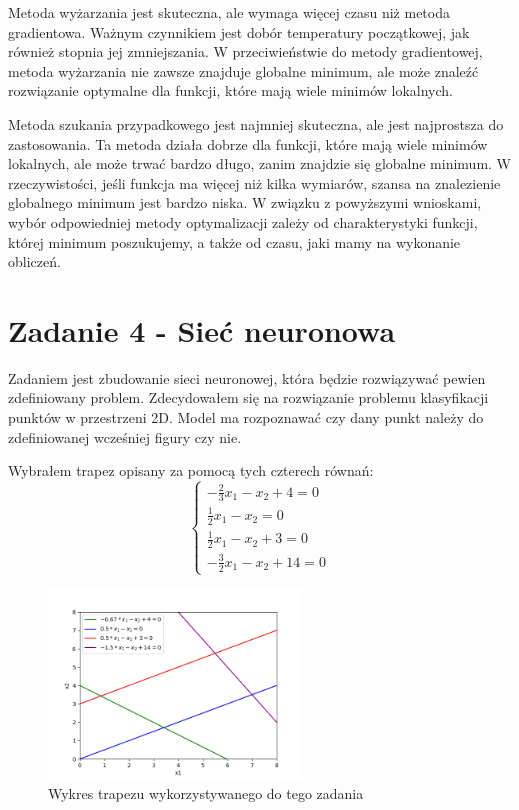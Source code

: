 \documentclass{article}
\begin{document}
Metoda wyżarzania jest skuteczna, ale wymaga więcej czasu niż metoda 
gradientowa. Ważnym czynnikiem jest dobór temperatury początkowej,
jak również stopnia jej zmniejszania.
W przeciwieństwie do metody gradientowej, metoda 
wyżarzania nie zawsze znajduje globalne minimum, ale może znaleźć 
rozwiązanie optymalne dla funkcji, które mają wiele minimów lokalnych. 

Metoda szukania przypadkowego jest najmniej skuteczna, ale jest najprostsza do 
zastosowania. Ta metoda działa dobrze dla funkcji, które mają wiele 
minimów lokalnych, ale może trwać bardzo długo, zanim znajdzie się 
globalne minimum. W rzeczywistości, jeśli funkcja ma więcej niż 
kilka wymiarów, szansa na znalezienie globalnego minimum jest bardzo niska.
W związku z powyższymi wnioskami, wybór odpowiedniej metody optymalizacji 
zależy od charakterystyki funkcji, której minimum poszukujemy, 
a także od czasu, jaki mamy na wykonanie obliczeń. 

\section{Zadanie 4 - Sieć neuronowa}

Zadaniem jest zbudowanie sieci neuronowej, która będzie rozwiązywać
pewien zdefiniowany problem. Zdecydowałem się na rozwiązanie problemu klasyfikacji
punktów w przestrzeni 2D. Model ma rozpoznawać czy dany punkt należy
do zdefiniowanej wcześniej figury czy nie.

Wybrałem trapez opisany za pomocą tych czterech równań:
\begin{equation}
    \begin{cases}
        -\frac{2}{3}x_1 - x_2 + 4 = 0 \\
        \frac{1}{2}x_1 - x_2 = 0 \\
        \frac{1}{2}x_1 - x_2 + 3 = 0 \\
        -\frac{3}{2}x_1 - x_2 + 14 = 0
    \end{cases}
\end{equation}
\begin{figure}[H]
    \centering
    \includegraphics[width=0.6\textwidth]{Zad4/trapez.png}
    \caption{Wykres trapezu wykorzystywanego do tego zadania}
\end{figure}
\end{document}
